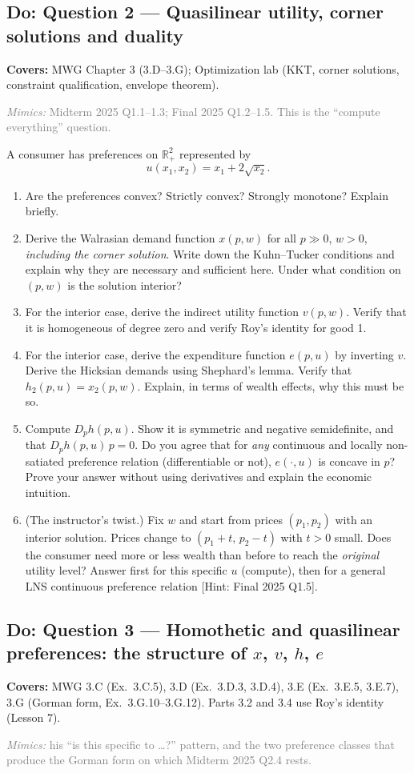 \documentclass[11pt]{article}
\newcommand{\R}{\mathbb{R}}
\newcommand{\covers}[1]{\par\noindent\textcolor{blue!60!black}{\small\textbf{Covers:} #1}\medskip}
\newcommand{\mimic}[1]{\par\noindent\textcolor{gray}{\small\textit{Mimics:} #1}\medskip}
\begin{document}
\subsection{Do: Question 2 --- Quasilinear utility, corner solutions and duality}
\covers{MWG Chapter 3 (3.D--3.G); Optimization lab (KKT, corner solutions, constraint qualification, envelope theorem).}
\mimic{Midterm 2025 Q1.1--1.3; Final 2025 Q1.2--1.5. This is the ``compute everything'' question.}

A consumer has preferences on $\R^2_+$ represented by
\[
u(x_1,x_2)=x_1+2\sqrt{x_2}.
\]
\begin{enumerate}[label=\textbf{2.\arabic*}]
  \item Are the preferences convex? Strictly convex? Strongly monotone? Explain briefly.
  \item Derive the Walrasian demand function $x(p,w)$ for all $p\gg0$, $w>0$, \emph{including the corner solution}. Write down the Kuhn--Tucker conditions and explain why they are necessary and sufficient here. Under what condition on $(p,w)$ is the solution interior?
  \item For the interior case, derive the indirect utility function $v(p,w)$. Verify that it is homogeneous of degree zero and verify Roy's identity for good 1.
  \item For the interior case, derive the expenditure function $e(p,u)$ by inverting $v$. Derive the Hicksian demands using Shephard's lemma. Verify that $h_2(p,u)=x_2(p,w)$. Explain, in terms of wealth effects, why this must be so.
  \item Compute $D_p h(p,u)$. Show it is symmetric and negative semidefinite, and that $D_ph(p,u)\,p=0$. Do you agree that for \emph{any} continuous and locally non-satiated preference relation (differentiable or not), $e(\cdot,u)$ is concave in $p$? Prove your answer without using derivatives and explain the economic intuition.
  \item (The instructor's twist.) Fix $w$ and start from prices $(p_1,p_2)$ with an interior solution. Prices change to $(p_1+t,\,p_2-t)$ with $t>0$ small. Does the consumer need more or less wealth than before to reach the \emph{original} utility level? Answer first for this specific $u$ (compute), then for a general LNS continuous preference relation [Hint: Final 2025 Q1.5].
\end{enumerate}


\subsection{Do: Question 3 --- Homothetic and quasilinear preferences: the structure of $x$, $v$, $h$, $e$}
\covers{MWG 3.C (Ex.~3.C.5), 3.D (Ex.~3.D.3, 3.D.4), 3.E (Ex.~3.E.5, 3.E.7), 3.G (Gorman form, Ex.~3.G.10--3.G.12). Parts 3.2 and 3.4 use Roy's identity (Lesson 7).}
\mimic{his ``is this specific to \dots?'' pattern, and the two preference classes that produce the Gorman form on which Midterm 2025 Q2.4 rests.}
\end{document}
